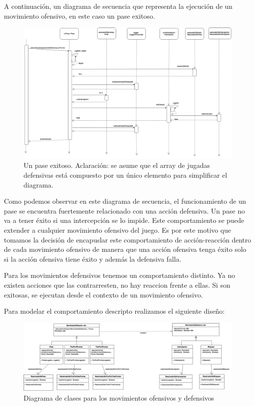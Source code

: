 A continuación, un diagrama de secuencia que representa la ejecución de un movimiento ofensivo, en este caso un pase exitoso.

\begin{landscape}

  \begin{figure}[h!]
   \includegraphics[scale=0.35]{imagenes/pase-exitoso.png}
   \caption{Un pase exitoso. Aclaración: se asume que el array de jugadas defensivas está compuesto por un único elemento para simplificar el diagrama.}
  \end{figure}

\end{landscape}

Como podemos observar en este diagrama de secuencia, el funcionamiento de un pase se encuentra fuertemente relacionado con una acción defensiva.
Un pase no va a tener éxito si una intercepción se lo impide. Este comportamiento se puede extender a cualquier movimiento ofensivo del juego.
Es por este motivo que tomamos la decisión de encapuslar este comportamiento de acción-reacción dentro de cada movimiento ofensivo
de manera que una acción ofensiva tenga éxito solo si la acción ofensiva tiene éxito y además la defensiva falla. 

Para los movimientos defensivos tenemos un comportamiento distinto. Ya no existen acciones que las contrarresten, no hay reaccion frente a ellas.
Si son exitosas, se ejecutan desde el contexto de un movimiento ofensivo. 

Para modelar el comportamiento descripto realizamos el siguiente diseño:

\begin{figure}[h!]
  \includegraphics[scale=0.25]{imagenes/diagrama-clases-movimiento.png}
  \caption{Diagrama de clases para los movimientos ofensivos y defensivos}
\end{figure}

